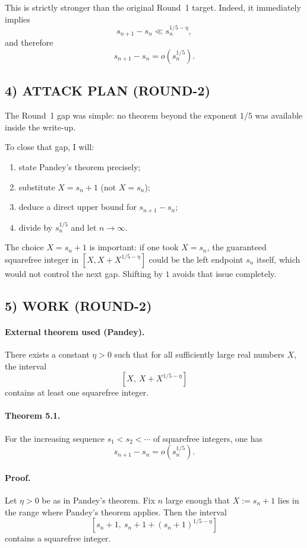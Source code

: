 This is strictly stronger than the original Round~1 target. Indeed, it immediately implies
\[
s_{n+1}-s_n\ll s_n^{1/5-\eta},
\]
and therefore
\[
s_{n+1}-s_n=o(s_n^{1/5}).
\]

\subsection*{4) ATTACK PLAN (ROUND-2)}

The Round~1 gap was simple: no theorem beyond the exponent $1/5$ was available inside the write-up.

To close that gap, I will:

\begin{enumerate}
\item state Pandey's theorem precisely;
\item substitute $X=s_n+1$ (not $X=s_n$);
\item deduce a direct upper bound for $s_{n+1}-s_n$;
\item divide by $s_n^{1/5}$ and let $n\to \infty$.
\end{enumerate}

The choice $X=s_n+1$ is important: if one took $X=s_n$, the guaranteed squarefree integer in $[X,X+X^{1/5-\eta}]$ could be the left endpoint $s_n$ itself, which would not control the next gap. Shifting by $1$ avoids that issue completely.

\subsection*{5) WORK (ROUND-2)}

\paragraph{External theorem used (Pandey).}
There exists a constant $\eta>0$ such that for all sufficiently large real numbers $X$, the interval
\[
[X,\ X+X^{1/5-\eta}]
\]
contains at least one squarefree integer.

\paragraph{Theorem 5.1.}
For the increasing sequence $s_1<s_2<\cdots$ of squarefree integers, one has
\[
s_{n+1}-s_n=o(s_n^{1/5}).
\]

\paragraph{Proof.}
Let $\eta>0$ be as in Pandey's theorem. Fix $n$ large enough that $X:=s_n+1$ lies in the range where Pandey's theorem applies. Then the interval
\[
[s_n+1,\ s_n+1+(s_n+1)^{1/5-\eta}]
\]
contains a squarefree integer.

